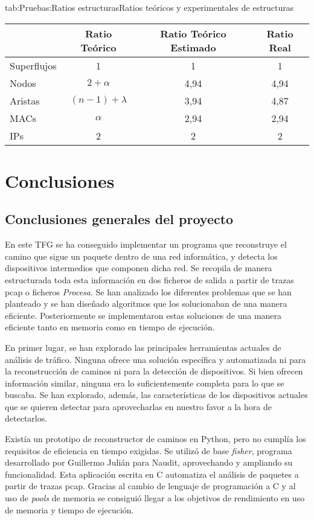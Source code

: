 \documentclass[tfg,epsbased,lof,lot,loa,covers,final,copyright,overleaf]{tfgtfmthesisuam}
\begin{document}
\begin{table}{tab:Pruebas:Ratios estructuras}{Ratios teóricos y experimentales de estructuras}
	\begin{tabular}{lccc}
		\toprule & \textbf{Ratio Teórico}  & \textbf{Ratio Teórico Estimado} & \textbf{Ratio Real} \\ 
		\midrule
		Superflujos & 1 & 1 & 1 \\
		Nodos & $2+\alpha$ & 4,94 & 4,94 \\
		Aristas & $(n-1)+\lambda$ & 3,94 & 4,87 \\
		MACs & $\alpha$ & 2,94 & 2,94 \\
		IPs & 2 & 2 & 2 \\ 
		\bottomrule
	\end{tabular}
\end{table}

\chapter{Conclusiones}
\label{chap:Conclusiones}

\section{Conclusiones generales del proyecto}

En este TFG se ha conseguido implementar un programa que reconstruye el camino que sigue un paquete dentro de una red informática, y detecta los dispositivos intermedios que componen dicha red. Se recopila de manera estructurada toda esta información en dos ficheros de salida a partir de trazas pcap o ficheros \textit{Procesa}. Se han analizado los diferentes problemas que se han planteado y se han diseñado algoritmos que los solucionaban de una manera eficiente. Posteriormente se implementaron estas soluciones de una manera eficiente tanto en memoria como en tiempo de ejecución.

En primer lugar, se han explorado las principales herramientas actuales de análisis de tráfico. Ninguna ofrece una solución específica y automatizada ni para la reconstrucción de caminos ni para la detección de dispositivos. Si bien ofrecen información similar, ninguna era lo suficientemente completa para lo que se buscaba. Se han explorado, además, las características de los dispositivos actuales que se quieren detectar para aprovecharlas en nuestro favor a la hora de detectarlos.

Existía un prototipo de reconstructor de caminos en Python, pero no cumplía los requisitos de eficiencia en tiempo exigidas. Se utilizó de base \textit{fisher}, programa desarrollado por Guillermo Julián para Naudit, aprovechando y ampliando su funcionalidad. Esta aplicación escrita en C automatiza el análisis de paquetes a partir de trazas pcap. Gracias al cambio de lenguaje de programación a C y al uso de \textit{pools} de memoria se consiguió llegar a los objetivos de rendimiento en uso de memoria y tiempo de ejecución.
\end{document}
